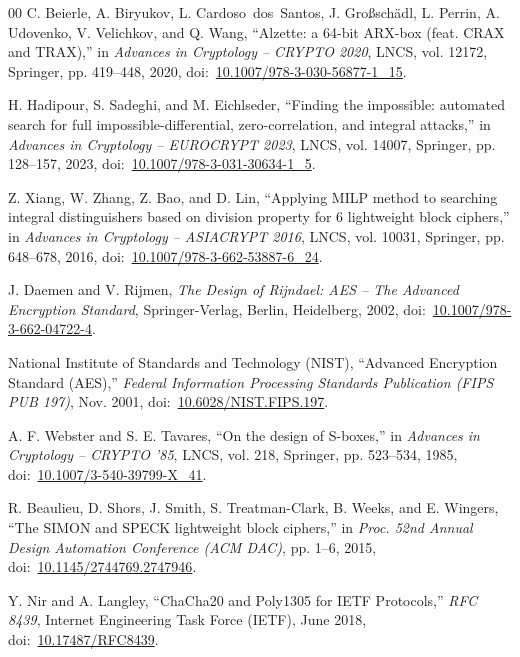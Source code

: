 \documentclass[review,12pt]{elsarticle}
\begin{document}
\begin{thebibliography}{00}
C. Beierle, A. Biryukov, L. Cardoso~dos~Santos, J. Gro{\ss}sch\"{a}dl, L. Perrin, A. Udovenko, V. Velichkov, and Q. Wang, ``Alzette: a 64-bit ARX-box (feat. CRAX and TRAX),'' in \textit{Advances in Cryptology -- CRYPTO 2020}, LNCS, vol. 12172, Springer, pp. 419--448, 2020, doi:~\href{https://doi.org/10.1007/978-3-030-56877-1_15}{10.1007/978-3-030-56877-1\_15}.

H. Hadipour, S. Sadeghi, and M. Eichlseder, ``Finding the impossible: automated search for full impossible-differential, zero-correlation, and integral attacks,'' in \textit{Advances in Cryptology -- EUROCRYPT 2023}, LNCS, vol. 14007, Springer, pp. 128--157, 2023, doi:~\href{https://doi.org/10.1007/978-3-031-30634-1_5}{10.1007/978-3-031-30634-1\_5}.

Z. Xiang, W. Zhang, Z. Bao, and D. Lin, ``Applying MILP method to searching integral distinguishers based on division property for 6 lightweight block ciphers,'' in \textit{Advances in Cryptology -- ASIACRYPT 2016}, LNCS, vol. 10031, Springer, pp. 648--678, 2016, doi:~\href{https://doi.org/10.1007/978-3-662-53887-6_24}{10.1007/978-3-662-53887-6\_24}.

J. Daemen and V. Rijmen, \textit{The Design of Rijndael: AES -- The Advanced Encryption Standard}, Springer-Verlag, Berlin, Heidelberg, 2002, doi:~\href{https://doi.org/10.1007/978-3-662-04722-4}{10.1007/978-3-662-04722-4}.

National Institute of Standards and Technology (NIST), ``Advanced Encryption Standard (AES),'' \textit{Federal Information Processing Standards Publication (FIPS PUB 197)}, Nov. 2001, doi:~\href{https://doi.org/10.6028/NIST.FIPS.197}{10.6028/NIST.FIPS.197}.

A. F. Webster and S. E. Tavares, ``On the design of S-boxes,'' in \textit{Advances in Cryptology -- CRYPTO '85}, LNCS, vol. 218, Springer, pp. 523--534, 1985, doi:~\href{https://doi.org/10.1007/3-540-39799-X_41}{10.1007/3-540-39799-X\_41}.

R. Beaulieu, D. Shors, J. Smith, S. Treatman-Clark, B. Weeks, and E. Wingers, ``The SIMON and SPECK lightweight block ciphers,'' in \textit{Proc. 52nd Annual Design Automation Conference (ACM DAC)}, pp. 1--6, 2015, doi:~\href{https://doi.org/10.1145/2744769.2747946}{10.1145/2744769.2747946}.

Y. Nir and A. Langley, ``ChaCha20 and Poly1305 for IETF Protocols,'' \textit{RFC 8439}, Internet Engineering Task Force (IETF), June 2018, doi:~\href{https://doi.org/10.17487/RFC8439}{10.17487/RFC8439}.


\end{thebibliography}
\end{document}
